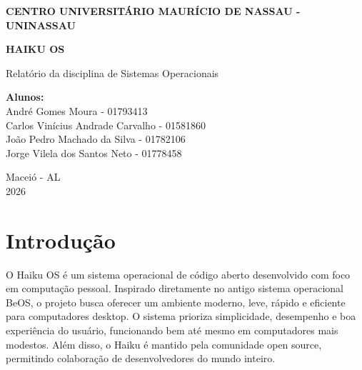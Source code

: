 \documentclass[12pt,a4paper]{article}
\begin{document}

\begin{titlepage}
    \centering
    
    {\Large \textbf{CENTRO UNIVERSITÁRIO MAURÍCIO DE NASSAU - UNINASSAU}}\\
    \vspace{2cm}
    
    {\Huge \textbf{HAIKU OS}}\\
    \vspace{1cm}
    
    {\Large Relatório da disciplina de Sistemas Operacionais}\\
    \vspace{2cm}
    
    \textbf{Alunos:}\\[0.5cm]
    
    André Gomes Moura - 01793413\\
    Carlos Vinícius Andrade Carvalho - 01581860\\
    João Pedro Machado da Silva - 01782106\\
    Jorge Vilela dos Santos Neto - 01778458\\
    
    \vfill
    
    Maceió - AL\\
    2026
    
\end{titlepage}


\tableofcontents
\newpage


\section{Introdução}

O Haiku OS é um sistema operacional de código aberto desenvolvido com foco em computação pessoal.
Inspirado diretamente no antigo sistema operacional BeOS, o projeto busca oferecer um ambiente moderno, leve, rápido e eficiente para computadores desktop.
O sistema prioriza simplicidade, desempenho e boa experiência do usuário, funcionando bem até mesmo em computadores mais modestos.
Além disso, o Haiku é mantido pela comunidade open source, permitindo colaboração de desenvolvedores do mundo inteiro.
\end{document}
